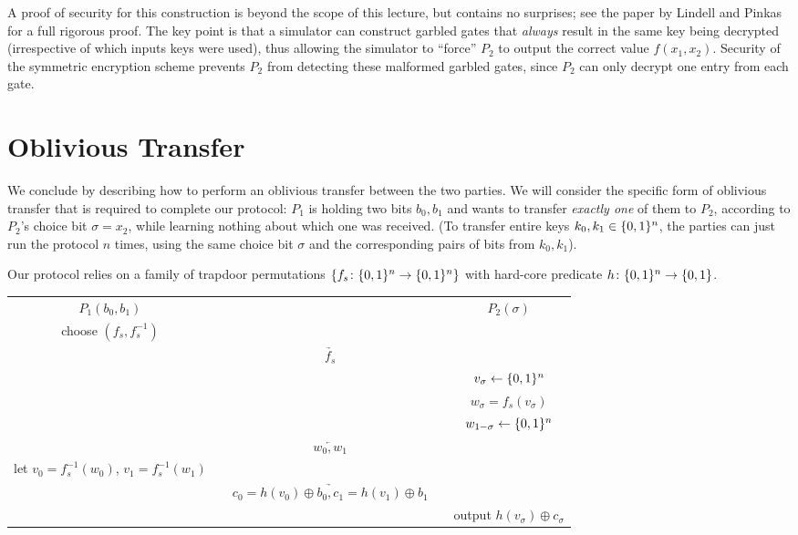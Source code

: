 \documentclass[11pt]{article}
\begin{document}
A proof of security for this construction is beyond the scope of this
lecture, but contains no surprises; see the paper by Lindell and
Pinkas for a full rigorous proof.  The key point is that a simulator
can construct garbled gates that \emph{always} result in the same key
being decrypted (irrespective of which inputs keys were used), thus
allowing the simulator to ``force'' $P_{2}$ to output the correct
value $f(x_{1}, x_{2})$.  Security of the symmetric encryption scheme
prevents $P_{2}$ from detecting these malformed garbled gates, since
$P_{2}$ can only decrypt one entry from each gate.

\section{Oblivious Transfer}
\label{sec:oblivious-transfer}

We conclude by describing how to perform an oblivious transfer between
the two parties.  We will consider the specific form of oblivious
transfer that is required to complete our protocol: $P_1$ is holding
two bits $b_0,b_1$ and wants to transfer \emph{exactly one} of them to
$P_2$, according to $P_{2}$'s choice bit $\sigma = x_{2}$, while
learning nothing about which one was received.  (To transfer entire
keys $k_{0}, k_{1} \in \{0,1\}^{n}$, the parties can just run the
protocol $n$ times, using the same choice bit $\sigma$ and the
corresponding pairs of bits from $k_{0}, k_{1}$).

Our protocol relies on a family of trapdoor permutations $\{f_{s}
  \colon \{0,1\}^{n} \to \{0,1\}^{n}\}$ with hard-core predicate $h \colon
\{0,1\}^{n} \to \{0,1\}$.

\begin{center}
  \begin{tabular}{ccc}
    $P_1(b_0,b_1)$ & & $P_2(\sigma)$ \\ 
    choose $(f_s, f_{s}^{-1})$ & & \\
    & $\underrightarrow{\quad f_s \quad}$ & \\
    & & $v_{\sigma} \gets \{0,1\}^{n}$ \\
    & & $w_{\sigma} = f_{s}(v_{\sigma})$ \\
    & & $w_{1-\sigma} \gets \{0,1\}^{n}$ \\
    & $\underleftarrow{\quad w_{0}, w_{1} \quad}$ & \\
    let $v_{0} = f_{s}^{-1}(w_{0})$, $v_{1} = f_{s}^{-1}(w_{1})$ &
    & \\
    & $\underrightarrow{\quad c_{0} = h(v_{0}) \oplus b_{0}, c_{1} =
      h(v_{1}) \oplus b_{1} \quad}$ & \\
    & & output $h(v_{\sigma}) \oplus c_{\sigma}$
  \end{tabular}
\end{center}
\end{document}
